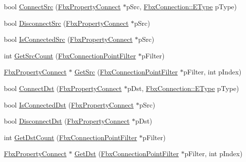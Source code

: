 \begin{DoxyCompactItemize}
bool \hyperlink{class_fbx_property_connect_af5c78b8a65708e2e4f82da4db2deb76a}{Connect\+Src} (\hyperlink{class_fbx_property_connect}{Fbx\+Property\+Connect} $\ast$p\+Src, \hyperlink{class_fbx_connection_a3df448a5db356652ab99fd2be2553749}{Fbx\+Connection\+::\+E\+Type} p\+Type)
\item 
bool \hyperlink{class_fbx_property_connect_a3d7abc5534b731ce55e77e2c200e7520}{Disconnect\+Src} (\hyperlink{class_fbx_property_connect}{Fbx\+Property\+Connect} $\ast$p\+Src)
\item 
bool \hyperlink{class_fbx_property_connect_a1c6e1ec9d5280419fac90dc53c5dce9d}{Is\+Connected\+Src} (\hyperlink{class_fbx_property_connect}{Fbx\+Property\+Connect} $\ast$p\+Src)
\item 
int \hyperlink{class_fbx_property_connect_a44f9ad9bc5eb7d3127a506fa8e2ea244}{Get\+Src\+Count} (\hyperlink{class_fbx_connection_point_filter}{Fbx\+Connection\+Point\+Filter} $\ast$p\+Filter)
\item 
\hyperlink{class_fbx_property_connect}{Fbx\+Property\+Connect} $\ast$ \hyperlink{class_fbx_property_connect_a7e32cdbf1b598eb7d187af169b9939e1}{Get\+Src} (\hyperlink{class_fbx_connection_point_filter}{Fbx\+Connection\+Point\+Filter} $\ast$p\+Filter, int p\+Index)
\item 
bool \hyperlink{class_fbx_property_connect_a9d8f3384bbc9516b873a081f1f328213}{Connect\+Dst} (\hyperlink{class_fbx_property_connect}{Fbx\+Property\+Connect} $\ast$p\+Dst, \hyperlink{class_fbx_connection_a3df448a5db356652ab99fd2be2553749}{Fbx\+Connection\+::\+E\+Type} p\+Type)
\item 
bool \hyperlink{class_fbx_property_connect_a3abc22f00d2507d6b1d77739a1add59d}{Is\+Connected\+Dst} (\hyperlink{class_fbx_property_connect}{Fbx\+Property\+Connect} $\ast$p\+Src)
\item 
bool \hyperlink{class_fbx_property_connect_ae72fd27cba668c4f98b09d681a0fa26d}{Disconnect\+Dst} (\hyperlink{class_fbx_property_connect}{Fbx\+Property\+Connect} $\ast$p\+Dst)
\item 
int \hyperlink{class_fbx_property_connect_ab113f35b3c1ec46e432d2214585d28aa}{Get\+Dst\+Count} (\hyperlink{class_fbx_connection_point_filter}{Fbx\+Connection\+Point\+Filter} $\ast$p\+Filter)
\item 
\hyperlink{class_fbx_property_connect}{Fbx\+Property\+Connect} $\ast$ \hyperlink{class_fbx_property_connect_a69c1a55bfdeeb234e4ab2f344ac8d70f}{Get\+Dst} (\hyperlink{class_fbx_connection_point_filter}{Fbx\+Connection\+Point\+Filter} $\ast$p\+Filter, int p\+Index)
\end{DoxyCompactItemize}
